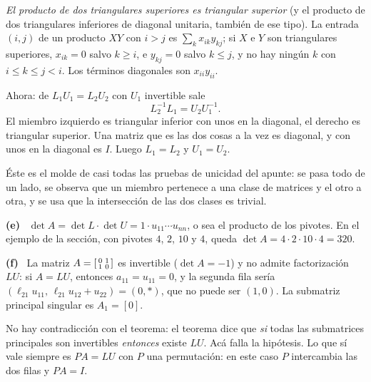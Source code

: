 \documentclass[11pt,a4paper]{article}
\newcommand{\itemsol}[1]{\par\medskip\noindent\textbf{(#1)}\ \ignorespaces}
\begin{document}
\emph{El producto de dos triangulares superiores es triangular superior} (y el
producto de dos triangulares inferiores de diagonal unitaria, también de ese
tipo). La entrada $(i,j)$ de un producto $XY$ con $i>j$ es $\sum_k x_{ik}y_{kj}$;
si $X$ e $Y$ son triangulares superiores, $x_{ik}=0$ salvo $k\ge i$, e
$y_{kj}=0$ salvo $k\le j$, y no hay ningún $k$ con $i\le k\le j<i$. Los términos
diagonales son $x_{ii}y_{ii}$.

Ahora: de $L_1U_1=L_2U_2$ con $U_1$ invertible sale
\[
L_2^{-1}L_1=U_2U_1^{-1}.
\]
El miembro izquierdo es triangular inferior con unos en la diagonal, el derecho
es triangular superior. Una matriz que es las dos cosas a la vez es diagonal, y
con unos en la diagonal es $I$. Luego $L_1=L_2$ y $U_1=U_2$.

Éste es el molde de casi todas las pruebas de unicidad del apunte: se pasa todo
de un lado, se observa que un miembro pertenece a una clase de matrices y el
otro a otra, y se usa que la intersección de las dos clases es trivial.

\itemsol{e} $\det A=\det L\cdot\det U=1\cdot u_{11}\cdots u_{nn}$, o sea el
producto de los pivotes. En el ejemplo de la sección, con pivotes $4$, $2$, $10$
y $4$, queda $\det A=4\cdot2\cdot10\cdot4=320$.

\itemsol{f} La matriz $A=\begin{bsmallmatrix}0&1\\1&0\end{bsmallmatrix}$ es
invertible ($\det A=-1$) y no admite factorización $LU$: si $A=LU$, entonces
$a_{11}=u_{11}=0$, y la segunda fila sería
$(\ell_{21}u_{11},\,\ell_{21}u_{12}+u_{22})=(0,\ast)$, que no puede ser $(1,0)$.
La submatriz principal singular es $A_1=[0]$.

No hay contradicción con el teorema: el teorema dice que \emph{si} todas las
submatrices principales son invertibles \emph{entonces} existe $LU$. Acá falla
la hipótesis. Lo que sí vale siempre es $PA=LU$ con $P$ una permutación: en este
caso $P$ intercambia las dos filas y $PA=I$.
\end{document}
